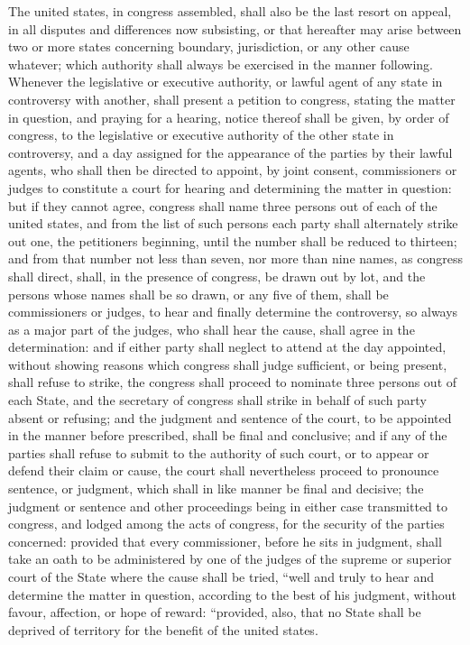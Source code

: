 The united states, in congress assembled, shall also be the last resort on appeal, in all disputes and differences now subsisting, or that hereafter may arise between two or more states concerning boundary, jurisdiction, or any other cause whatever; which authority shall always be exercised in the manner following. Whenever the legislative or executive authority, or lawful agent of any state in controversy with another, shall present a petition to congress, stating the matter in question, and praying for a hearing, notice thereof shall be given, by order of congress, to the legislative or executive authority of the other state in controversy, and a day assigned for the appearance of the parties by their lawful agents, who shall then be directed to appoint, by joint consent, commissioners or judges to constitute a court for hearing and determining the matter in question: but if they cannot agree, congress shall name three persons out of each of the united states, and from the list of such persons each party shall alternately strike out one, the petitioners beginning, until the number shall be reduced to thirteen; and from that number not less than seven, nor more than nine names, as congress shall direct, shall, in the presence of congress, be drawn out by lot, and the persons whose names shall be so drawn, or any five of them, shall be commissioners or judges, to hear and finally determine the controversy, so always as a major part of the judges, who shall hear the cause, shall agree in the determination: and if either party shall neglect to attend at the day appointed, without showing reasons which congress shall judge sufficient, or being present, shall refuse to strike, the congress shall proceed to nominate three persons out of each State, and the secretary of congress shall strike in behalf of such party absent or refusing; and the judgment and sentence of the court, to be appointed in the manner before prescribed, shall be final and conclusive; and if any of the parties shall refuse to submit to the authority of such court, or to appear or defend their claim or cause, the court shall nevertheless proceed to pronounce sentence, or judgment, which shall in like manner be final and decisive; the judgment or sentence and other proceedings being in either case transmitted to congress, and lodged among the acts of congress, for the security of the parties concerned: provided that every commissioner, before he sits in judgment, shall take an oath to be administered by one of the judges of the supreme or superior court of the State where the cause shall be tried, “well and truly to hear and determine the matter in question, according to the best of his judgment, without favour, affection, or hope of reward: “provided, also, that no State shall be deprived of territory for the benefit of the united states.

